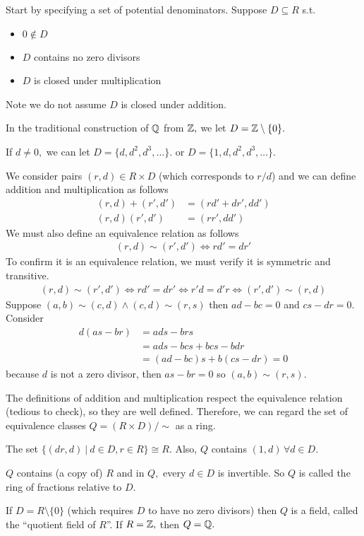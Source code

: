 \documentclass[a4paper]{article}
\begin{document}
Start by specifying a set of potential denominators. Suppose $D\subseteq R$ s.t. \begin{itemize}
    \item $0\notin D$
    \item $D$ contains no zero divisors
    \item $D$ is closed under multiplication
\end{itemize}
Note we do not assume $D$ is closed under addition.

In the traditional construction of $\mathbb{Q}$ from $\mathbb{Z},$ we let $D=\mathbb{Z}\setminus\{0\}.$ 

If $d\neq0,$ we can let $D=\{d,d^2,d^3,\ldots\}.$ or $D=\{1,d,d^2,d^3,\ldots\}.$

We consider pairs $(r,d)\in R\times D$ (which corresponds to $r/d$) and we can define addition and multiplication as follows \begin{align}
    (r,d)+(r',d')&=(rd'+dr',dd')\\
    (r,d)(r',d')&=(rr',dd')
\end{align}
We must also define an equivalence relation as follows \begin{align}
    (r,d)\sim(r',d')\iff rd'=dr'
\end{align}
To confirm it is an equivalence relation, we must verify it is symmetric and transitive. \begin{align}
    (r,d)\sim(r',d')\iff rd'=dr'\iff r'd=d'r\iff (r',d')\sim(r,d)
\end{align}
Suppose $(a,b)\sim(c,d)\land (c,d)\sim(r,s)$ then $ad-bc=0$ and $cs-dr=0.$ Consider \begin{align}
    d(as-br)&=ads-brs\\
    &=ads-bcs+bcs-bdr\\
    &=(ad-bc)s+b(cs-dr)=0
\end{align}
because $d$ is not a zero divisor, then $as-br=0$ so $(a,b)\sim(r,s).$

The definitions of addition and multiplication respect the equivalence relation (tedious to check), so they are well defined. Therefore, we can regard the set of equivalence classes $Q=(R\times D)/\sim$ as a ring.

The set $\{(dr,d)~|~d\in D,r\in R\}\cong R.$ Also, $Q$ contains $(1,d)\,\forall d\in D.$

$Q$ contains (a copy of) $R$ and in $Q,$ every $d\in D$ is invertible. So $Q$ is called the ring of fractions relative to $D.$

If $D=R\setminus\{0\}$ (which requires $D$ to have no zero divisors) then $Q$ is a field, called the ``quotient field of $R$''. If $R=\mathbb{Z},$ then $Q=\mathbb{Q}.$
\end{document}
